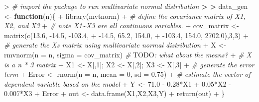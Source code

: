 \documentclass[
]{article}
\newenvironment{Shaded}{\begin{snugshade}}{\end{snugshade}}
\newcommand{\AlertTok}[1]{\textcolor[rgb]{0.94,0.16,0.16}{#1}}
\newcommand{\AttributeTok}[1]{\textcolor[rgb]{0.77,0.63,0.00}{#1}}
\newcommand{\CommentTok}[1]{\textcolor[rgb]{0.56,0.35,0.01}{\textit{#1}}}
\newcommand{\ControlFlowTok}[1]{\textcolor[rgb]{0.13,0.29,0.53}{\textbf{#1}}}
\newcommand{\DecValTok}[1]{\textcolor[rgb]{0.00,0.00,0.81}{#1}}
\newcommand{\ErrorTok}[1]{\textcolor[rgb]{0.64,0.00,0.00}{\textbf{#1}}}
\newcommand{\FloatTok}[1]{\textcolor[rgb]{0.00,0.00,0.81}{#1}}
\newcommand{\FunctionTok}[1]{\textcolor[rgb]{0.00,0.00,0.00}{#1}}
\newcommand{\NormalTok}[1]{#1}
\newcommand{\OtherTok}[1]{\textcolor[rgb]{0.56,0.35,0.01}{#1}}
\newcommand{\SpecialCharTok}[1]{\textcolor[rgb]{0.00,0.00,0.00}{#1}}
\begin{document}
\begin{Shaded}
\begin{Highlighting}[]
\SpecialCharTok{\textgreater{}} \CommentTok{\# import the package to run multivariate normal distribution}
\ErrorTok{\textgreater{}} 
\ErrorTok{\textgreater{}}\NormalTok{ data\_gen }\OtherTok{\textless{}{-}} \ControlFlowTok{function}\NormalTok{(n)\{}
\SpecialCharTok{+}   \FunctionTok{library}\NormalTok{(mvtnorm)}
\SpecialCharTok{+}   \CommentTok{\# define the covariance matrix of X1, X2, and X3}
\SpecialCharTok{+}   \CommentTok{\# note X1\textasciitilde{}X3 are all continuous variables.}
\SpecialCharTok{+}\NormalTok{   cov\_matrix }\OtherTok{\textless{}{-}} \FunctionTok{matrix}\NormalTok{(}\FunctionTok{c}\NormalTok{(}\FloatTok{13.6}\NormalTok{, }\SpecialCharTok{{-}}\FloatTok{14.5}\NormalTok{, }\SpecialCharTok{{-}}\FloatTok{103.4}\NormalTok{, }
\SpecialCharTok{+}                          \SpecialCharTok{{-}}\FloatTok{14.5}\NormalTok{, }\FloatTok{65.2}\NormalTok{, }\FloatTok{154.0}\NormalTok{,}
\SpecialCharTok{+}                          \SpecialCharTok{{-}}\FloatTok{103.4}\NormalTok{, }\FloatTok{154.0}\NormalTok{, }\FloatTok{2702.0}\NormalTok{),}\DecValTok{3}\NormalTok{,}\DecValTok{3}\NormalTok{)}
\SpecialCharTok{+}   \CommentTok{\# generate the X\textquotesingle{}s matrix using multivariate normal distribution}
\SpecialCharTok{+}\NormalTok{   X }\OtherTok{\textless{}{-}} \FunctionTok{rmvnorm}\NormalTok{(}\AttributeTok{n =}\NormalTok{ n, }\AttributeTok{sigma =}\NormalTok{ cov\_matrix) }\CommentTok{\# }\AlertTok{TODO}\CommentTok{: what about the means?}
\SpecialCharTok{+}   \CommentTok{\# X is a n * 3 matrix}
\SpecialCharTok{+}\NormalTok{   X1 }\OtherTok{\textless{}{-}}\NormalTok{ X[,}\DecValTok{1}\NormalTok{]; X2 }\OtherTok{\textless{}{-}}\NormalTok{ X[,}\DecValTok{2}\NormalTok{]; X3 }\OtherTok{\textless{}{-}}\NormalTok{ X[,}\DecValTok{3}\NormalTok{]}
\SpecialCharTok{+}   \CommentTok{\# generate the error term}
\SpecialCharTok{+}\NormalTok{   Error }\OtherTok{\textless{}{-}} \FunctionTok{rnorm}\NormalTok{(}\AttributeTok{n =}\NormalTok{ n, }\AttributeTok{mean =} \DecValTok{0}\NormalTok{, }\AttributeTok{sd =} \FloatTok{0.75}\NormalTok{)}
\SpecialCharTok{+}   \CommentTok{\# estimate the vector of dependent variable based on the model}
\SpecialCharTok{+}\NormalTok{   Y }\OtherTok{\textless{}{-}} \FloatTok{71.0} \SpecialCharTok{{-}} \FloatTok{0.28}\SpecialCharTok{*}\NormalTok{X1 }\SpecialCharTok{+} \FloatTok{0.05}\SpecialCharTok{*}\NormalTok{X2 }\SpecialCharTok{{-}} \FloatTok{0.007}\SpecialCharTok{*}\NormalTok{X3 }\SpecialCharTok{+}\NormalTok{ Error}
\SpecialCharTok{+}\NormalTok{   out }\OtherTok{\textless{}{-}} \FunctionTok{data.frame}\NormalTok{(X1,X2,X3,Y)}
\SpecialCharTok{+}   \FunctionTok{return}\NormalTok{(out)}
\SpecialCharTok{+}\NormalTok{ \}}
\end{Highlighting}
\end{Shaded}
\end{document}
